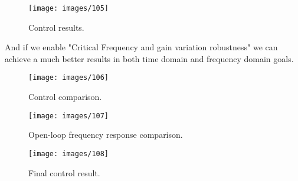 \documentclass[12pt,a4paper]{article}
\begin{document}
\begin{figure}[h]
	\caption{Control results.}
	\texttt{[image: images/105]}
	\centering
\end{figure}

\FloatBarrier

And if we enable "Critical Frequency and gain variation robustness" we can achieve a much better results in both time domain and frequency domain goals.

\begin{figure}[h]
	\caption{Control comparison.}
	\texttt{[image: images/106]}
	\centering
\end{figure}

\FloatBarrier

\begin{figure}[h]
	\caption{Open-loop frequency response comparison.}
	\texttt{[image: images/107]}
	\centering
\end{figure}

\FloatBarrier

\begin{figure}[h]
	\caption{Final control result.}
	\texttt{[image: images/108]}
	\centering
\end{figure}

\FloatBarrier

\ \ \ \ 
\end{document}
